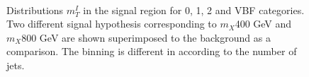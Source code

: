 \begin{figure}[htbp]
\centering
{}
\\
\caption{Distributions  $m_T^I$ in the signal region for 0, 1, 2 and VBF categories. Two different signal hypothesis corresponding to $m_X $400 GeV and $m_X $800 GeV are shown superimposed to the background as a comparison. The binning is different in according to the number of jets.}
    \label{fig:mti_sigOF}
\end{figure}



